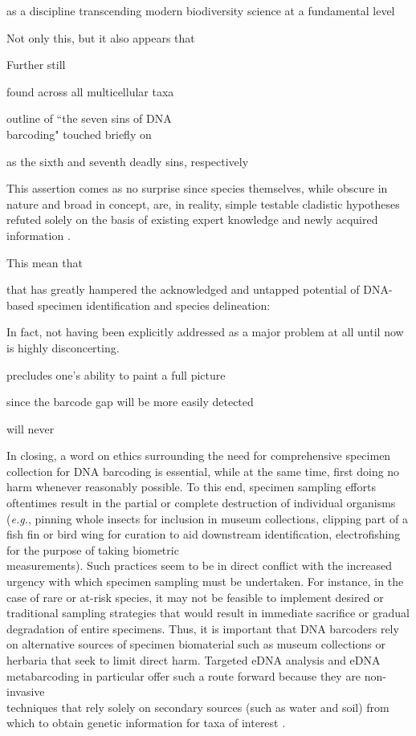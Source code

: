 as a discipline transcending modern biodiversity science at a fundamental level

Not only this, but it also appears that

Further still

found across all multicellular taxa

outline of ``the seven sins of DNA \\ barcoding" touched briefly on 

as the sixth and seventh deadly sins, respectively

This assertion comes as no surprise since species themselves, while obscure in nature and broad in concept, are, in reality, simple testable cladistic hypotheses refuted solely on the basis of existing expert knowledge and newly acquired information \cite{pante2015species}.


This mean that

that has greatly hampered the acknowledged and untapped potential of DNA-based specimen identification and species delineation:

In fact, not having been explicitly addressed as a major problem at all until now is highly disconcerting.

precludes one's ability to paint a full picture

since the barcode gap will be more easily detected

will never

In closing, a word on ethics surrounding the need for comprehensive specimen \\ collection for DNA barcoding is essential, while at the same time, first doing no harm whenever reasonably possible. To this end, specimen sampling efforts oftentimes result in the partial or complete destruction of individual organisms (\textit{e.g.}, pinning whole insects for inclusion in museum collections, clipping part of a fish fin or bird wing for curation to aid downstream identification, electrofishing for the purpose of taking biometric \\ measurements). Such practices seem to be in direct conflict with the increased urgency with which specimen sampling must be undertaken. For instance, in the case of rare or at-risk species, it may not be feasible to implement desired or traditional sampling strategies that would result in immediate sacrifice or gradual degradation of entire specimens. Thus, it is important that DNA barcoders rely on alternative sources of specimen biomaterial such as museum collections or herbaria that seek to limit direct harm. Targeted eDNA analysis and eDNA metabarcoding in particular offer such a route forward because they are non-invasive \\ techniques that rely solely on secondary sources (such as water and soil) from which to obtain genetic information for taxa of interest \cite{thomsen2015environmental}.



